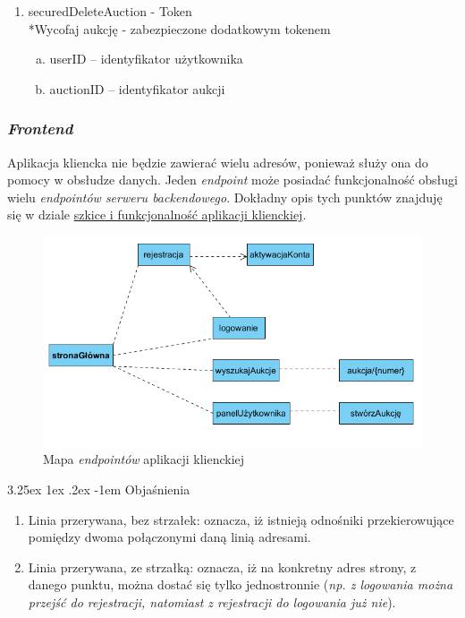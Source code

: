\documentclass[10pt,titlepage]{article} %
\makeatletter
\renewcommand{\normalsize}{\fontsize{8pt}{10pt}\selectfont} %
\renewcommand\paragraph{\@startsection{paragraph}{5}{\z@}%
  {3.25ex \@plus1ex \@minus.2ex}%
  {-1em}%
  {\normalfont\normalsize\bfseries}}
\makeatother
\begin{document}
\begin{enumerate}[1.]
\item securedDeleteAuction - Token
\\*Wycofaj aukcję - zabezpieczone dodatkowym tokenem
\begin{enumerate}[a.]
\item userID – identyfikator użytkownika
\item auctionID – identyfikator aukcji
\end{enumerate}

\end{enumerate}
\subsubsection{\textit{Frontend}}
Aplikacja kliencka nie będzie zawierać wielu adresów, ponieważ służy ona do pomocy w obsłudze danych. Jeden \textit{endpoint} może posiadać funkcjonalność obsługi wielu \textit{endpointów serweru backendowego}. Dokładny opis tych punktów znajduję się w dziale
\hyperref[Szkice i funkcjonalność aplikacji klienckiej]{szkice i funkcjonalność aplikacji klienckiej}.
\begin{figure}[H]
\includegraphics[width=\textwidth]{img/sekcja2/mapaEndpointowFrontend}
\caption[Mapa \textit{endpointów} aplikacji klienckiej]{Mapa \textit{endpointów} aplikacji klienckiej}
\end{figure}
\paragraph{Objaśnienia}\mbox{}\\
\begin{enumerate}[1.]
\item Linia przerywana, bez strzałek: oznacza, iż istnieją odnośniki przekierowujące pomiędzy dwoma połączonymi daną linią adresami.
\item Linia przerywana, ze strzałką: oznacza, iż na konkretny adres strony, z danego punktu, można dostać się tylko jednostronnie (\textit{np. z logowania można przejść do rejestracji, natomiast z rejestracji do logowania już nie}).
\end{enumerate}
\end{document}
